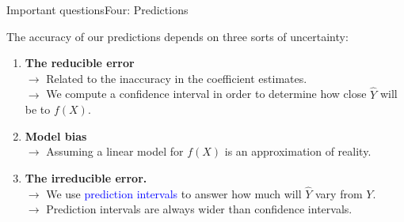 \begin{frame}{Important questions}{Four: Predictions}

The accuracy of our predictions depends on three sorts of uncertainty: \pause

\begin{enumerate}
    \item \textbf{The reducible error} 
    \\ $\rightarrow$ Related to the inaccuracy in the coeﬃcient estimates.  \pause 
    \\ $\rightarrow$ We compute a confidence interval in order to determine how close $\hat{Y}$ will be to $f(X)$. \pause

    \item \textbf{Model bias} \pause 
    \\ $\rightarrow$ Assuming a linear model for $f(X)$ is an approximation of reality. \pause

    \item \textbf{The irreducible error.} \pause \\
    $\rightarrow$ We use \textcolor{blue}{prediction intervals} to answer how much will $\hat{Y}$ vary from $Y$. \pause \\
    $\rightarrow$  Prediction intervals are always wider than confidence intervals.
    
\end{enumerate}
    
\end{frame}